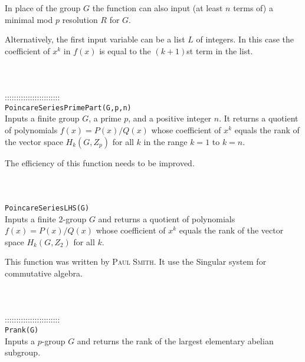 \documentclass[a4paper,11pt]{report}
\begin{document}
{ In place of the group $G$ the function can also input (at least $n$ terms of) a minimal mod $p$ resolution $R$ for $G$. 

 Alternatively, the first input variable can be a list $L$ of integers. In this case the coefficient of $x^k$ in $f(x)$ is equal to the $(k+1)$st term in the list. \\
 \\
 \\
 \\
 ::::::::::::::::::::::::\\
 \texttt{PoincareSeriesPrimePart(G,p,n) }\\
 

 Inputs a finite group $G$, a prime $p$, and a positive integer $n$. It returns a quotient of polynomials $f(x)=P(x)/Q(x)$ whose coefficient of $x^k$ equals the rank of the vector space $H_k(G,Z_p)$ for all $k$ in the range $k=1$ to $k=n$. 

 The efficiency of this function needs to be improved. \\
 \\
 \\
 \\
 \texttt{PoincareSeriesLHS(G) }\\
 

 Inputs a finite $2$-group $G$ and returns a quotient of polynomials $f(x)=P(x)/Q(x)$ whose coefficient of $x^k$ equals the rank of the vector space $H_k(G,Z_2)$ for all $k$. 

 This function was written by \textsc{Paul Smith}. It use the Singular system for commutative algebra. \\
 \\
 \\
 \\
 ::::::::::::::::::::::::\\
 \texttt{Prank(G) }\\
 

 Inputs a $p$-group $G$ and returns the rank of the largest elementary abelian subgroup. \\
 \\
 \\
 }

 
\end{document}
